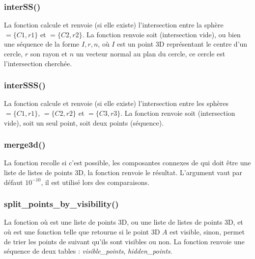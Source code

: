 \subsubsection{interSS()}

La fonction  calcule et renvoie (si elle existe) l'intersection entre la sphère $=\{C1,r1\}$ et $=\{C2,r2\}$. La fonction renvoie soit \nil (intersection vide), ou bien une séquence de la forme $I,r,n$, où $I$ est un point 3D représentant le centre d'un cercle, $r$ son rayon et $n$ un vecteur normal au plan du cercle, ce cercle est l'intersection cherchée. 

\subsubsection{interSSS()}

La fonction  calcule et renvoie (si elle existe) l'intersection entre les sphères $=\{C1,r1\}$, $=\{C2,r2\}$ et $=\{C3,r3\}$. La fonction renvoie soit \nil (intersection vide), soit un seul point, soit deux points (séquence).


\subsubsection{merge3d()}

La fonction  recolle si c'est possible, les composantes connexes de  qui doit être une liste de listes de points 3D, la fonction renvoie le résultat. L'argument  vaut par défaut $10^{-10}$, il est utilisé lors des comparaisons.

\subsubsection{split\_points\_by\_visibility()}

La fonction  où  est une liste de points 3D, ou une liste de listes de points 3D, et où  est une fonction telle que  retourne \true si le point 3D $A$ est visible, \false sinon, permet de trier les points de  suivant qu'ils sont visibles ou non. La fonction renvoie une séquence de deux tables : \emph{visible\_points}, \emph{hidden\_points}.

